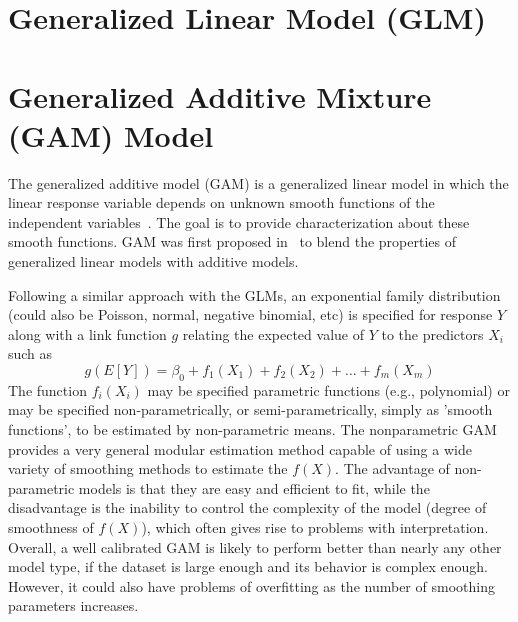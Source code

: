 \documentclass [11pt, proquest] {uwthesis}[2015/03/03]
\begin{document}
\section{Generalized Linear Model (GLM)}

\section{Generalized Additive Mixture (GAM) Model}
\label{sec:gamintro}
The generalized additive model (GAM) is a generalized linear model in which the linear response variable depends on unknown smooth functions of the independent variables~\cite{Wiki}. The goal is to provide characterization about these smooth functions. GAM was first proposed in~\cite{Hastie86}	 to blend the properties of generalized linear models with additive models. 

Following a similar approach with the GLMs, an exponential family distribution (could also be Poisson, normal, negative binomial, etc) is specified for response $Y$ along with a link function $g$ relating the expected value of $Y$ to the predictors $X_i$ such as
\begin{equation*}
g(E[Y]) = \beta_0 + f_1(X_1) + f_2(X_2) + \hdots + f_m(X_m)
\end{equation*}
The function $f_i(X_i)$ may be specified parametric functions (e.g., polynomial) or may be specified non-parametrically, or semi-parametrically, simply as 'smooth functions', to be estimated by non-parametric means. The nonparametric GAM provides a very general modular estimation method capable of using a wide variety of smoothing methods to estimate the $f(X)$. The advantage of non-parametric models is that they are easy and efficient to fit, while the disadvantage is the inability to control the complexity of the model (degree of smoothness of $f(X)$), which often gives rise to problems with interpretation. Overall, a well calibrated GAM is likely to perform better than nearly any other model type, if the dataset is large enough and its behavior is complex enough. However, it could also have problems of overfitting as the number of smoothing parameters increases. 
\end{document}
